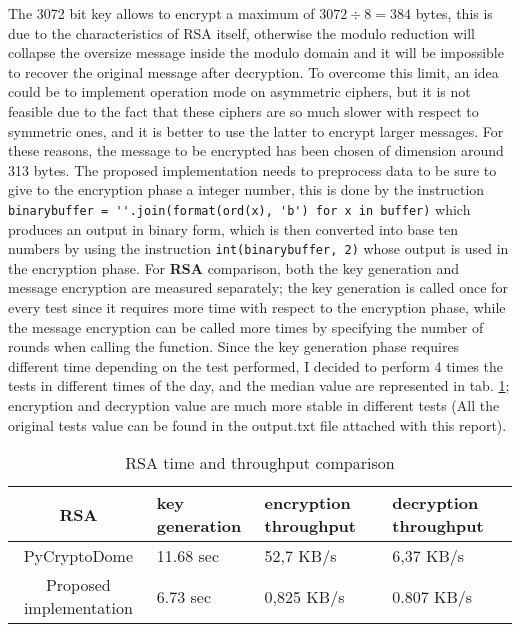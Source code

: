 \documentclass{article}
\begin{document}
The 3072 bit key allows to encrypt a maximum of $3072 \div 8 = 384$ bytes, this is due to the characteristics of RSA itself, otherwise the modulo reduction will collapse the oversize message inside the modulo domain and it will be impossible to recover the original message after decryption. To overcome this limit, an idea could be to implement operation mode on asymmetric ciphers, but it is not feasible due to the fact that these ciphers are so much slower with respect to symmetric ones, and it is better to use the latter to encrypt larger messages. For these reasons, the message to be encrypted has been chosen of dimension around 313 bytes. The proposed implementation needs to preprocess data to be sure to give to the encryption phase a integer number, this is done by the instruction \verb+binarybuffer = ''.join(format(ord(x), 'b') for x in buffer)+ which \linebreak produces an output in binary form, which is then converted into base ten numbers by using the instruction \verb+int(binarybuffer, 2)+ whose output is used in the encryption phase.\newline
For \textbf{RSA} comparison, both the key generation and message encryption are measured separately; the key generation is called once for every test since it requires more time with respect to the encryption phase, while the message encryption can be called more times by specifying the number of rounds when calling the function. Since the key generation phase requires different time depending on the test performed, I decided to perform 4 times the tests in different times of the day, and the median value are represented in tab. \ref{tab:RSA}; encryption and decryption value are much more stable in different tests (All the original tests value can be found in the output.txt file attached with this report).

\renewcommand{\arraystretch}{2}

\begin{table}[H]
	\begin{center}
		\begin{tabular}{ |c || m{2cm} | m{2cm} | m{2cm}|  }
			\hline
			RSA & key \linebreak generation & encryption \linebreak throughput & decryption \linebreak throughput \\ [0.5ex] 
			\hline\hline
			PyCryptoDome & 11.68 sec & 52,7 KB/s & 6,37 KB/s \\ 
			\hline
			Proposed implementation & 6.73 sec & 0,825 KB/s & 0.807 KB/s \\ 
			\hline
		\end{tabular}
		\caption{RSA time and throughput comparison}
		\label{tab:RSA}
	\end{center}
\end{table}
\end{document}
